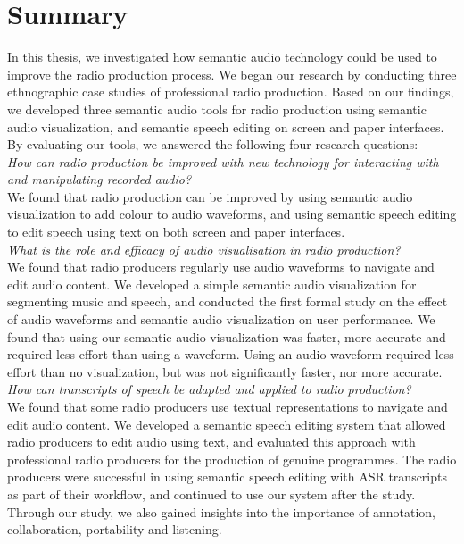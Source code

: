\clearpage
\section{Summary}\label{sec:conclusions-conclusions}

In this thesis, we investigated how semantic audio technology could be used to improve the radio production process.
We began our research by conducting three ethnographic case studies of professional radio production.  Based on our
findings, we developed three semantic audio tools for radio production using semantic audio visualization, and semantic
speech editing on screen and paper interfaces. By evaluating our tools, we answered the following four research
questions: 
\\

\noindent
\hangindent=15pt
\textit{How can radio production be improved with new technology for interacting with and manipulating recorded audio?}
\\

  We found that radio production can be improved by using semantic audio visualization to add colour to audio
  waveforms, and using semantic speech editing to edit speech using text on both screen and paper interfaces.
  \\

\noindent
\hangindent=15pt
\textit{What is the role and efficacy of audio visualisation in radio production?}
\\

We found that radio producers regularly use audio waveforms to navigate and edit audio content.  We developed a
simple semantic audio visualization for segmenting music and speech, and conducted the first formal study on the effect
of audio waveforms and semantic audio visualization on user performance. We found that using our semantic audio
visualization was faster, more accurate and required less effort than using a waveform.  Using an audio waveform
required less effort than no visualization, but was not significantly faster, nor more accurate.
\\

\noindent
\hangindent=15pt
\textit{How can transcripts of speech be adapted and applied to radio production?}
\\

We found that some radio producers use textual representations to navigate and edit audio content.  We developed a
semantic speech editing system that allowed radio producers to edit audio using text, and evaluated this approach with
professional radio producers for the production of genuine programmes. The radio producers were successful in using
semantic speech editing with ASR transcripts as part of their workflow, and continued to use our system after the
study. Through our study, we also gained insights into the importance of annotation, collaboration, portability and
listening.
\\

